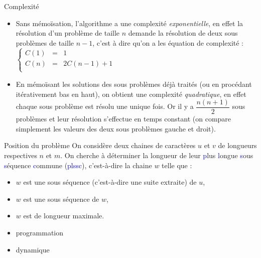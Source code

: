 \documentclass[10pt]{beamer}
\begin{document}
\begin{frame}{\Ctitle}{\stitle}
	\begin{exampleblock}{Complexité}
		\begin{itemize}

			\item<1-> Sans mémoïsation, l'algorithme a une complexité \textit{exponentielle}, en effet la résolution d'un problème de taille $n$ demande la résolution de deux sous problèmes de taille $n-1$, c'est à dire qu'on a les équation de complexité : \\
			      $\left\{
				      \begin{array}{lll}
					      C(1) & = & 1            \\
					      C(n) & = & 2C(n-1)  + 1 \\
				      \end{array}
				      \right.$\\
			\item<2-> En mémoïsant les solutions des sous problèmes déjà traités (ou en procédant itérativement bas en haut), on obtient une complexité \textit{quadratique}, en effet chaque sous problème est résolu une unique fois. Or il y  a $\dfrac{n(n+1)}{2}$ sous problèmes et leur résolution s'effectue en temps constant (on compare simplement les valeurs des deux sous problèmes gauche et droit).
		\end{itemize}
	\end{exampleblock}
\end{frame}

\begin{frame}{\Ctitle}{\stitle}
	\begin{exampleblock}{Position du problème}
		On considère deux chaines de caractères $u$ et $v$ de longueurs respectives $n$ et $m$. On cherche à déterminer la longueur de leur \textcolor{blue}{p}lus \textcolor{blue}{l}ongue \textcolor{blue}{s}ous \textcolor{blue}{s}équence \textcolor{blue}{c}ommune (\textcolor{blue}{\sc plssc}), c'est-à-dire la chaine $w$ telle que :
		\begin{itemize}
			\item<2-> $w$ est une sous séquence (c'est-à-dire une suite extraite) de $u$,
			\item<3-> $w$ est une sous séquence de $w$,
			\item<4-> $w$ est de longueur maximale.
		\end{itemize}
		\begin{itemize}
			\item<6-> {\sc progr\textcolor{BrickRed}{a}m\textcolor{BrickRed}{m}at\textcolor{BrickRed}{i}on}
			\item<7-> {\sc dyn\textcolor{BrickRed}{ami}que}
		\end{itemize}
	\end{exampleblock}
\end{frame}
\end{document}
